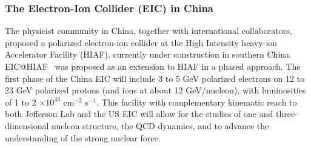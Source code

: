  

\subsubsection{The Electron-Ion Collider (EIC) in China}

The physicist community in China, %
together with international collaborators, proposed a polarized electron-ion collider at the  High Intensity heavy-ion Accelerator Facility (HIAF), currently under construction in southern China.
EIC@HIAF~\cite{Anderle_2021} was proposed as an extension to HIAF in a phased approach. The ﬁrst phase of the China EIC will include 3 to 5 GeV polarized electrons on 12 to 23 GeV polarized protons (and ions at about 12 GeV/nucleon), with luminosities of 1 to 2 $\times 10^{33}$ cm$^{-2}$ s$^{-1}$. This facility with complementary kinematic reach to both Jefferson Lab and the US EIC will allow for the studies of one and three-dimensional nucleon structure, the QCD dynamics, and to advance the understanding of the strong nuclear force. 







